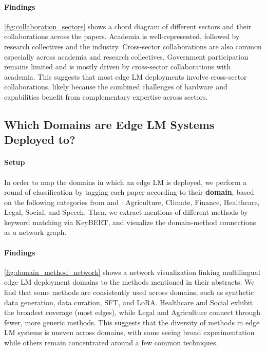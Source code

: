\documentclass[11pt,a4paper]{article}
\begin{document}
\paragraph{Findings}
\autoref{fig:collaboration_sectors} shows a chord diagram of different sectors and their collaborations across the \numdeploymentpapers{} papers.
Academia is well-represented, followed by research collectives and the industry.
Cross-sector collaborations are also common especially across academia and research collectives.
Government participation remains limited and is mostly driven by cross-sector collaborations with academia.
This suggests that most edge LM deployments involve cross-sector collaborations, likely because the combined challenges of hardware and capabilities benefit from complementary expertise across sectors.

\subsection{Which Domains are Edge LM Systems Deployed to?}
\label{sec:which_domains_are_edge_lm_systems}

\paragraph{Setup}
In order to map the domains in which an edge LM is deployed,
we perform a round of classification by tagging each paper according to their \textbf{domain}, based on the following categories from \citet{rogers-etal-2023-qa} and \citet{chen2024a}: Agriculture, Climate, Finance, Healthcare, Legal, Social, and Speech.
Then, we extract mentions of different methods by keyword matching via KeyBERT, and visualize the domain-method connections as a network graph.

\paragraph{Findings}
\autoref{fig:domain_method_network} shows a network visualization linking multilingual edge LM deployment domains to the methods mentioned in their abstracts.
We find that some methods are consistently used across domains, such as synthetic data generation, data curation, SFT, and LoRA.
Healthcare and Social exhibit the broadest coverage (most edges), while Legal and Agriculture connect through fewer, more generic methods.
This suggests that the diversity of methods in edge LM systems is uneven across domains, with some seeing broad experimentation while others remain concentrated around a few common techniques.
\end{document}
